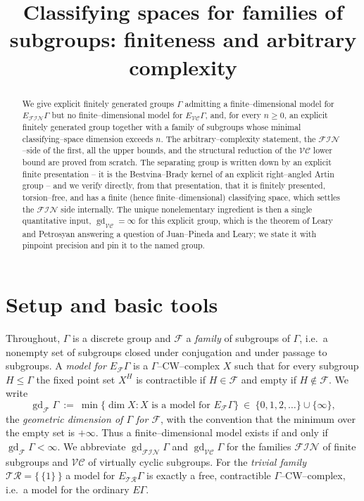 \documentclass{amsart}
\theoremstyle{definition}
\newcommand{\FIN}{\mathcal{F\!I\!N}}
\newcommand{\VC}{\mathcal{V\!C}}
\newcommand{\gd}{\operatorname{gd}}
\begin{document}
\title{Classifying spaces for families of subgroups: finiteness and arbitrary complexity}
\maketitle

\begin{abstract}
We give explicit finitely generated groups $\Gamma$ admitting a finite--dimensional model
for $E_{\FIN}\Gamma$ but no finite--dimensional model for $E_{\VC}\Gamma$, and, for every
$n\ge 0$, an explicit finitely generated group together with a family of subgroups whose
minimal classifying--space dimension exceeds $n$. The arbitrary--complexity statement, the
$\FIN$--side of the first, all the upper bounds, and the structural reduction of the $\VC$
lower bound are proved from scratch. The separating group is written down by an explicit
finite presentation -- it is the Bestvina--Brady kernel of an explicit right--angled Artin
group -- and we verify directly, from that presentation, that it is finitely presented,
torsion--free, and has a finite (hence finite--dimensional) classifying space, which settles
the $\FIN$ side internally. The unique nonelementary ingredient is then a single quantitative
input, $\gd_{\VC}=\infty$ for this explicit group, which is the theorem of Leary and Petrosyan
answering a question of Juan--Pineda and Leary; we state it with pinpoint precision and pin it
to the named group.
\end{abstract}

\section{Setup and basic tools}

Throughout, $\Gamma$ is a discrete group and $\mathcal F$ a \emph{family} of subgroups of
$\Gamma$, i.e.\ a nonempty set of subgroups closed under conjugation and under passage to
subgroups. A \emph{model for $E_{\mathcal F}\Gamma$} is a $\Gamma$--CW--complex $X$ such that
for every subgroup $H\le\Gamma$ the fixed point set $X^H$ is contractible if $H\in\mathcal F$
and empty if $H\notin\mathcal F$. We write
\[
\gd_{\mathcal F}\Gamma\ :=\ \min\{\dim X : X \text{ is a model for } E_{\mathcal F}\Gamma\}\ \in\ \{0,1,2,\dots\}\cup\{\infty\},
\]
the \emph{geometric dimension of $\Gamma$ for $\mathcal F$}, with the convention that the
minimum over the empty set is $+\infty$. Thus a finite--dimensional model exists if and only if
$\gd_{\mathcal F}\Gamma<\infty$. We abbreviate $\gd_{\FIN}\Gamma$ and $\gd_{\VC}\Gamma$ for the
families $\FIN$ of finite subgroups and $\VC$ of virtually cyclic subgroups. For the
\emph{trivial family} $\mathcal{TR}=\{\,\{1\}\,\}$ a model for $E_{\mathcal{TR}}\Gamma$ is
exactly a free, contractible $\Gamma$--CW--complex, i.e.\ a model for the ordinary $E\Gamma$.
\end{document}
